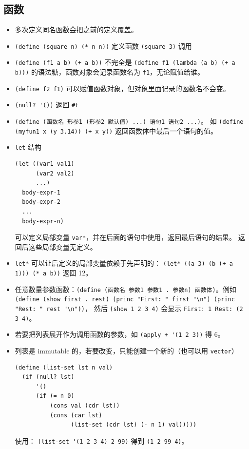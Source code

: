 \subsection{函数}
\begin{itemize}
\item 多次定义同名函数会把之前的定义覆盖。
\item \verb`(define (square n) (* n n))` 定义函数 \verb`(square 3)` 调用
\item \verb`(define (f1 a b) (+ a b))` 不完全是 \verb`(define f1 (lambda (a b) (+ a b)))` 的语法糖，函数对象会记录函数名为 \verb`f1`，无论赋值给谁。
\item \verb`(define f2 f1)` 可以赋值函数对象，但对象里面记录的函数名不会变。
\item \verb`(null? '())` 返回 \verb`#t`
\item \verb`(define (函数名 形参1 (形参2 默认值) ...) 语句1 语句2 ...)`。 如 \verb`(define (myfun1 x (y 3.14)) (+ x y))` 返回函数体中最后一个语句的值。
\item \verb`let` 结构
\begin{lstlisting}[language=none]
(let ((var1 val1)
      (var2 val2)
      ...)
  body-expr-1
  body-expr-2
  ...
  body-expr-n)
\end{lstlisting}
可以定义局部变量 \verb`var*`，并在后面的语句中使用，返回最后语句的结果。 返回后这些局部变量无定义。
\item \verb`let*` 可以让后定义的局部变量依赖于先声明的： \verb`(let* ((a 3) (b (+ a 1))) (* a b))` 返回 12。
\item 任意数量参数函数：\verb`(define (函数名 参数1 参数1 . 参数n) 函数体)`。例如 \verb`(define (show first . rest) (princ "First: " first "\n") (princ "Rest: " rest "\n"))`， 然后 \verb`(show 1 2 3 4)` 会显示 \verb`First: 1 Rest: (2 3 4)`。
\item 若要把列表展开作为调用函数的参数，如 \verb`(apply + '(1 2 3))` 得 6。
\item 列表是 immutable 的，若要改变，只能创建一个新的（也可以用 \verb`vector`）
\begin{lstlisting}[language=none]
(define (list-set lst n val)
  (if (null? lst)
      '()
      (if (= n 0)
          (cons val (cdr lst))
          (cons (car lst)
                (list-set (cdr lst) (- n 1) val)))))
\end{lstlisting}
使用： \verb`(list-set '(1 2 3 4) 2 99)` 得到 \verb`(1 2 99 4)`。
\end{itemize}

